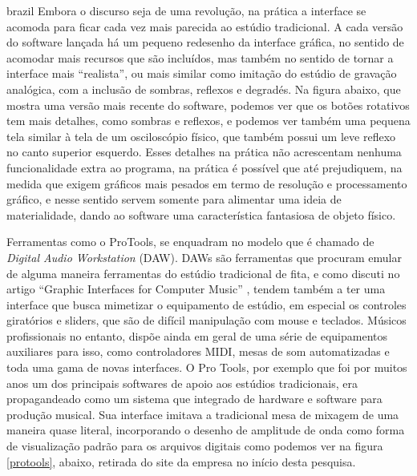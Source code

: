 \begin{otherlanguage*}{brazil}
Embora o discurso seja de uma revolução, na prática a interface se acomoda para ficar cada vez mais parecida ao estúdio tradicional. A cada versão do software lançada há um pequeno redesenho da interface gráfica, no sentido de acomodar mais recursos que são incluídos, mas também no sentido de tornar a interface mais “realista”, ou mais similar como imitação do estúdio de gravação analógica, com a inclusão de sombras, reflexos e degradés. Na figura abaixo, que mostra uma versão mais recente do software, podemos ver que os botões rotativos tem mais detalhes, como sombras e reflexos, e podemos ver também uma pequena tela similar à tela de um osciloscópio físico, que também possui um leve reflexo no canto superior esquerdo. Esses detalhes na prática não acrescentam nenhuma funcionalidade extra ao programa, na prática é possível que até prejudiquem, na medida que exigem gráficos mais pesados em termo de resolução e processamento gráfico, e nesse sentido servem somente para alimentar uma ideia de materialidade, dando ao software uma característica fantasiosa de objeto físico. 

Ferramentas como o ProTools, se enquadram no modelo que é chamado de \emph{Digital Audio Workstation} (DAW). DAWs são ferramentas que procuram emular de alguma maneira ferramentas do estúdio tradicional de fita, e como discuti no artigo ``Graphic Interfaces for Computer Music'' \cite{Stolfi2016}, tendem também a ter uma interface que busca mimetizar o equipamento de estúdio, em especial os controles giratórios e sliders, que são de difícil manipulação com mouse e teclados. Músicos profissionais no entanto, dispõe ainda em geral de uma série de equipamentos auxiliares para isso, como controladores MIDI, mesas de som automatizadas e toda uma gama de novas interfaces. O Pro Tools, por exemplo que foi por muitos anos um dos principais softwares de apoio aos estúdios tradicionais, era propagandeado como um sistema que integrado de hardware e software para produção musical. Sua interface imitava a tradicional mesa de mixagem de uma maneira quase literal, incorporando o desenho de amplitude de onda como forma de visualização padrão para os arquivos digitais como podemos ver na figura \ref{protools}, abaixo, retirada do site da empresa no início desta pesquisa.





\end{otherlanguage*}
